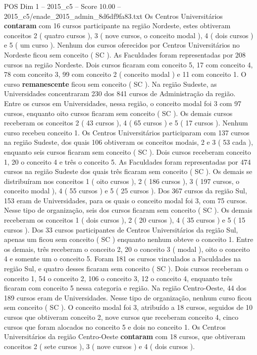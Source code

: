 \begin{textsample}{POS Dim 1 – 2015\_c5 – Score 10.00 – 2015\_c5/enade\_2015\_admin\_8d6df9fa83.txt}
Os Centros Universitários \textbf{contaram} com 16 cursos participante na região Nordeste, estes obtiveram conceitos 2 ( quatro cursos ), 3 ( nove cursos, o conceito modal ), 4 ( dois cursos ) e 5 ( um curso ).
Nenhum dos cursos oferecidos por Centros Universitários no Nordeste ficou sem conceito ( SC ).
As Faculdades foram representadas por 208 cursos na região Nordeste.
Dois cursos ficaram com conceito 5, 17 com conceito 4, 78 com conceito 3, 99 com conceito 2 ( conceito modal ) e 11 com conceito 1.
O curso \textbf{remanescente} ficou sem conceito ( SC ).
Na região Sudeste, as Universidades concentraram 230 dos 841 cursos de Administração da região.
Entre os cursos em Universidades, nessa região, o conceito modal foi 3 com 97 cursos, enquanto oito cursos ficaram sem conceito ( SC ).
Os demais cursos receberam os conceitos 2 ( 43 cursos ), 4 ( 65 cursos ) e 5 ( 17 cursos ).
Nenhum curso recebeu conceito 1.
Os Centros Universitários participaram com 137 cursos na região Sudeste, dos quais 106 obtiveram os conceitos modais, 2 e 3 ( 53 cada ), enquanto seis cursos ficaram sem conceito ( SC ).
Dois cursos receberam conceito 1, 20 o conceito 4 e três o conceito 5.
As Faculdades foram representadas por 474 cursos na região Sudeste dos quais três ficaram sem conceito ( SC ).
Os demais se distribuíram nos conceitos 1 ( oito cursos ), 2 ( 186 cursos ), 3 ( 197 cursos, o conceito modal ), 4 ( 55 cursos ) e 5 ( 25 cursos ).
Dos 367 cursos da região Sul, 153 eram de Universidades, para os quais o conceito modal foi 3, com 75 cursos.
Nesse tipo de organização, seis dos cursos ficaram sem conceito ( SC ).
Os demais receberam os conceitos 1 ( dois cursos ), 2 ( 20 cursos ), 4 ( 35 cursos ) e 5 ( 15 cursos ).
Dos 33 cursos participantes de Centros Universitários da região Sul, apenas um ficou sem conceito ( SC ) enquanto nenhum obteve o conceito 1.
Entre os demais, três receberam o conceito 2, 20 o conceito 3 ( modal ), oito o conceito 4 e somente um o conceito 5.
Foram 181 os cursos vinculados a Faculdades na região Sul, e quatro desses ficaram sem conceito ( SC ).
Dois cursos receberam o conceito 1, 54 o conceito 2, 106 o conceito 3, 12 o conceito 4, enquanto três ficaram com conceito 5 nessa categoria e região.
Na região Centro-Oeste, 44 dos 189 cursos eram de Universidades.
Nesse tipo de organização, nenhum curso ficou sem conceito ( SC ).
O conceito modal foi 3, atribuído a 18 cursos, seguidos de 10 cursos que obtiveram conceito 2, nove cursos que receberam conceito 4, cinco cursos que foram alocados no conceito 5 e dois no conceito 1.
Os Centros Universitários da região Centro-Oeste \textbf{contaram} com 18 cursos, que obtiveram conceitos 2 ( sete cursos ), 3 ( nove cursos ) e 4 ( dois cursos ).

\end{textsample}
